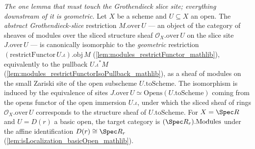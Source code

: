 
\begin{lemma}\leanok
  \label{lem:over_restrict_iso}
  \textit{The one lemma that must touch the Grothendieck slice site; everything downstream of it is
  geometric.}
  Let \(X\) be a scheme and \(U \subseteq X\) an open. The \emph{abstract Grothendieck-slice}
  restriction \(M.\mathrm{over}\,U\) — an object of the category of sheaves of modules over the
  sliced structure sheaf \(\mathcal{O}_X.\mathrm{over}\,U\) on the slice site \(J.\mathrm{over}\,U\) —
  is canonically isomorphic to the \emph{geometric} restriction
  \((\mathrm{restrictFunctor}\,U.\iota).\mathrm{obj}\,M\)
  (\cref{lem:modules_restrictFunctor_mathlib}), equivalently to the pullback \(U.\iota^{*} M\)
  (\cref{lem:modules_restrictFunctorIsoPullback_mathlib}), as a sheaf of modules on the small Zariski
  site of the open subscheme \(U.\mathrm{toScheme}\). The isomorphism is induced by the equivalence
  of sites \(J.\mathrm{over}\,U \simeq \mathrm{Opens}(U.\mathrm{toScheme})\) coming from the opens
  functor of the open immersion \(U.\iota\), under which the sliced sheaf of rings
  \(\mathcal{O}_X.\mathrm{over}\,U\) corresponds to the structure sheaf of \(U.\mathrm{toScheme}\).
  For \(X = \Spec R\) and \(U = D(r)\) a basic open, the target category is
  \((\Spec R_r).\mathrm{Modules}\) under the affine identification \(D(r) \cong \Spec R_r\)
  (\cref{lem:isLocalization_basicOpen_mathlib}).
\end{lemma}
